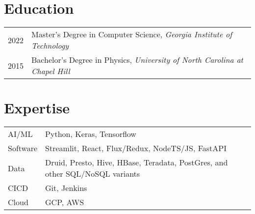 \documentclass[a4paper, 9pt]{article} %
\begin{document}
\section{Education}

\begin{tabular}{ll}	
2022 & \hspace{0.95cm} Master's Degree in Computer Science, \emph{Georgia Institute of Technology}\\
2015 & \hspace{0.95cm} Bachelor's Degree in Physics, \emph{University of North Carolina at Chapel Hill}\\

\end{tabular}
\bigskip

\section{Expertise}

\begin{tabular}{llp{11cm}}
AI/ML & \hspace{0.25cm} Python, Keras, Tensorflow\\
Software & \hspace{0.25cm} Streamlit, React, Flux/Redux, NodeTS/JS, FastAPI\\
Data & \hspace{0.25cm} Druid, Presto, Hive, HBase, Teradata, PostGres, and other SQL/NoSQL variants\\
CICD & \hspace{0.25cm} Git, Jenkins\\
Cloud & \hspace{0.25cm} GCP, AWS
\end{tabular}

\end{document}
